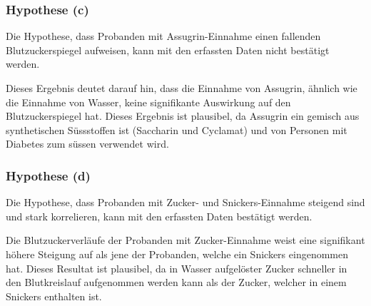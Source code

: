 \subsubsection{Hypothese (c)}
Die Hypothese, dass Probanden mit Assugrin-Einnahme einen fallenden
Blutzuckerspiegel aufweisen, kann mit den erfassten Daten nicht
bestätigt werden.

Dieses Ergebnis deutet darauf hin, dass die Einnahme von Assugrin,
ähnlich wie die Einnahme von Wasser, keine signifikante Auswirkung
auf den Blutzuckerspiegel hat. Dieses Ergebnis ist plausibel, da
Assugrin ein gemisch aus synthetischen Süssstoffen ist (Saccharin
und Cyclamat) und von Personen mit Diabetes zum süssen verwendet
wird.

\subsubsection{Hypothese (d)}
Die Hypothese, dass Probanden mit Zucker- und Snickers-Einnahme
steigend sind und stark korrelieren, kann mit den erfassten Daten
bestätigt werden.

Die Blutzuckerverläufe der Probanden mit Zucker-Einnahme weist
eine signifikant höhere Steigung auf als jene der Probanden,
welche ein Snickers eingenommen hat. Dieses Resultat ist plausibel,
da in Wasser aufgelöster Zucker schneller in den Blutkreislauf
aufgenommen werden kann als der Zucker, welcher in einem Snickers
enthalten ist.
